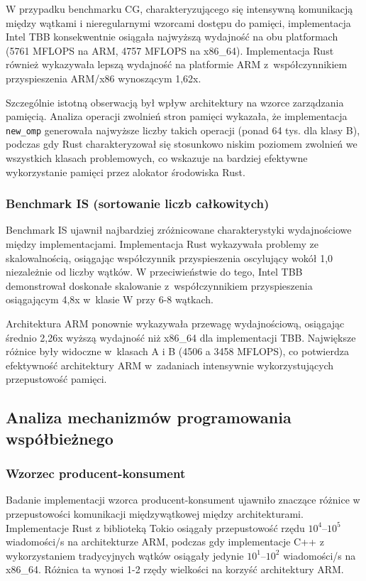 W przypadku benchmarku CG, charakteryzującego się intensywną komunikacją między wątkami i nieregularnymi wzorcami dostępu do pamięci, implementacja Intel TBB konsekwentnie osiągała najwyższą wydajność na obu platformach (5761 MFLOPS na ARM, 4757 MFLOPS na x86\_64). Implementacja Rust również wykazywała lepszą wydajność na platformie ARM z~współczynnikiem przyspieszenia ARM/x86 wynoszącym 1,62x.

Szczególnie istotną obserwacją był wpływ architektury na wzorce zarządzania pamięcią. Analiza operacji zwolnień stron pamięci wykazała, że implementacja \texttt{new\_omp} generowała najwyższe liczby takich operacji (ponad 64 tys. dla klasy B), podczas gdy Rust charakteryzował się stosunkowo niskim poziomem zwolnień we wszystkich klasach problemowych, co wskazuje na bardziej efektywne wykorzystanie pamięci przez alokator środowiska Rust.

\subsubsection{Benchmark IS (sortowanie liczb całkowitych)}

Benchmark IS ujawnił najbardziej zróżnicowane charakterystyki wydajnościowe między implementacjami. Implementacja Rust wykazywała problemy ze skalowalnością, osiągając współczynnik przyspieszenia oscylujący wokół 1,0 niezależnie od liczby wątków. W przeciwieństwie do tego, Intel TBB demonstrował doskonałe skalowanie z~współczynnikiem przyspieszenia osiągającym 4,8x w~klasie W przy 6-8 wątkach.

Architektura ARM ponownie wykazywała przewagę wydajnościową, osiągając średnio 2,26x wyższą wydajność niż x86\_64 dla implementacji TBB. Największe różnice były widoczne w~klasach A i B (4506 a 3458 MFLOPS), co potwierdza efektywność architektury ARM w~zadaniach intensywnie wykorzystujących przepustowość pamięci.

\subsection{Analiza mechanizmów programowania współbieżnego}

\subsubsection{Wzorzec producent-konsument}

Badanie implementacji wzorca producent-konsument ujawniło znaczące różnice w przepustowości komunikacji międzywątkowej między architekturami. Implementacje Rust z biblioteką Tokio osiągały przepustowość rzędu $10^4$--$10^5$ wiadomości/s na architekturze ARM, podczas gdy implementacje C++ z wykorzystaniem tradycyjnych wątków osiągały jedynie $10^1$--$10^2$ wiadomości/s na x86\_64. Różnica ta wynosi 1-2 rzędy wielkości na korzyść architektury ARM.

